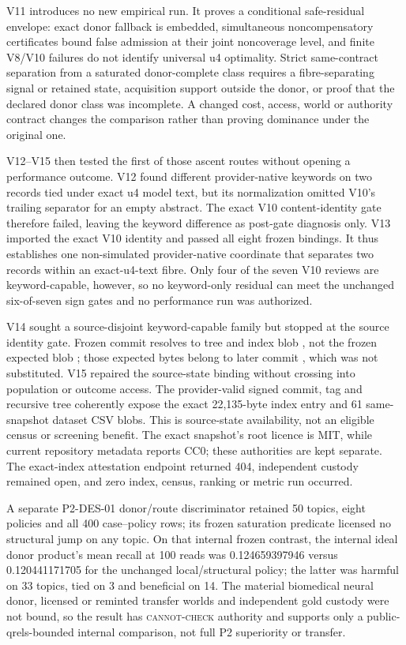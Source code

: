 V11 introduces no new empirical run. It proves a conditional safe-residual
envelope: exact donor fallback is embedded, simultaneous noncompensatory
certificates bound false admission at their joint noncoverage level, and finite
V8/V10 failures do not identify universal u4 optimality. Strict same-contract
separation from a saturated donor-complete class requires a fibre-separating
signal or retained state, acquisition support outside the donor, or proof that
the declared donor class was incomplete. A changed cost, access, world or
authority contract changes the comparison rather than proving dominance under
the original one.

V12--V15 then tested the first of those ascent routes without opening a
performance outcome.  V12 found different provider-native keywords on two
records tied under exact u4 model text, but its normalization omitted V10's
trailing separator for an empty abstract.  The exact V10 content-identity gate
therefore failed, leaving the keyword difference as post-gate diagnosis only.
V13 imported the exact V10 identity and passed all eight frozen bindings.  It
thus establishes one non-simulated provider-native coordinate that separates
two records within an exact-u4-text fibre.  Only four of the seven V10 reviews
are keyword-capable, however, so no keyword-only residual can meet the unchanged
six-of-seven sign gates and no performance run was authorized.

V14 sought a source-disjoint keyword-capable family but stopped at the source
identity gate.  Frozen commit
 resolves to tree
 and index blob
, not the frozen expected
blob ; those expected bytes
belong to later commit ,
which was not substituted.  V15 repaired the source-state binding without
crossing into population or outcome access.  The provider-valid signed commit,
tag and recursive tree coherently expose the exact 22,135-byte index entry and
61 same-snapshot dataset CSV blobs.  This is source-state availability, not an
eligible census or screening benefit.  The exact snapshot's root licence is
MIT, while current repository metadata reports CC0; these authorities are kept
separate.  The exact-index attestation endpoint returned 404, independent
custody remained open, and zero index, census, ranking or metric run occurred.

A separate P2-DES-01 donor/route discriminator retained 50 topics, eight
policies and all 400 case--policy rows; its frozen saturation predicate licensed
no structural jump on any topic.  On that internal frozen contrast, the
internal ideal donor product's mean recall at 100 reads was 0.124659397946 versus
0.120441171705 for the unchanged local/structural policy; the latter was harmful
on 33 topics, tied on 3 and beneficial on 14.  The material biomedical neural
donor, licensed or reminted transfer worlds and independent gold custody were
not bound, so the result has \textsc{cannot-check} authority and supports only a
public-qrels-bounded internal comparison, not full P2 superiority or transfer.

